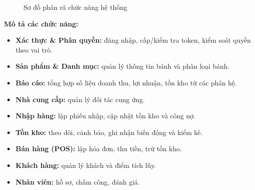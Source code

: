 \documentclass[12pt,a4paper]{report}
\begin{document}
\begin{figure}[H]
\centering
{}
\caption{Sơ đồ phân rã chức năng hệ thống}
\end{figure}

\noindent\textbf{Mô tả các chức năng:}
\begin{itemize}[leftmargin=1.4cm,nosep]
  \item \textbf{Xác thực \& Phân quyền:} đăng nhập, cấp/kiểm tra token, kiểm soát quyền theo vai trò.
  \item \textbf{Sản phẩm \& Danh mục:} quản lý thông tin bánh và phân loại bánh.
  \item \textbf{Báo cáo:} tổng hợp số liệu doanh thu, lợi nhuận, tồn kho từ các phân hệ.
  \item \textbf{Nhà cung cấp:} quản lý đối tác cung ứng.
  \item \textbf{Nhập hàng:} lập phiếu nhập, cập nhật tồn kho và công nợ.
  \item \textbf{Tồn kho:} theo dõi, cảnh báo, ghi nhận biến động và kiểm kê.
  \item \textbf{Bán hàng (POS):} lập hóa đơn, thu tiền, trừ tồn kho.
  \item \textbf{Khách hàng:} quản lý khách và điểm tích lũy.
  \item \textbf{Nhân viên:} hồ sơ, chấm công, đánh giá.
\end{itemize}
\end{document}
